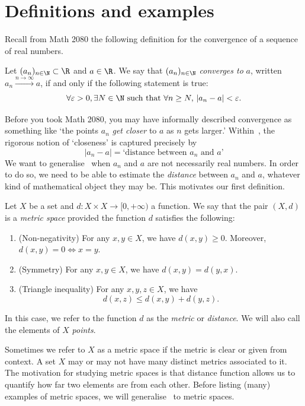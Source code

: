 \section{Definitions and examples}
\label{sec:5_1-2}
Recall from Math 2080 the following definition for the convergence of a sequence of real numbers.
\begin{defn}
	\label{defn:cvg_real}
	Let $(a_n)_{n\in\N}\subset \R$ and $a\in \R$. We say that $(a_n)_{n\in\N}$ \textit{converges to }$a$, written $a_n\overset{n\to \infty}{\to}a$, if and only if the following statement is true:
	\[
	\forall \varepsilon>0,\exists N\in\N\text{ such that }\forall n\ge N, \, |a_n - a|<\varepsilon.
	\]
\end{defn}
Before you took Math 2080, you may have informally described convergence as something like `the points $a_n$ \textit{get closer} to $a$ as $n$ gets larger.' Within~, the rigorous notion of `closeness' is captured precisely by
\[
|a_n-a| = \text{`distance between }a_n\text{ and }a\text{'}
\]
We want to generalise~ when $a_n$ and $a$ are not necessarily real numbers. In order to do so, we need to be able to estimate the \textit{distance} between $a_n$ and $a$, whatever kind of mathematical object they may be. This motivates our first definition.
\begin{defn}
	\label{defn:metric}
	Let $X$ be a set and $d:X\times X \to [0,+\infty)$ a function. We say that the pair $(X,d)$ is a \textit{metric space} provided the function $d$ satisfies the following:
	\begin{enumerate}[label = \textbf{M\arabic*)}]
		\item (Non-negativity) For any $x,y\in X$, we have $d(x,y)\ge 0$. Moreover, $d(x,y) = 0 \iff x=y$. \label{m:pos}
		\item (Symmetry) For any $x,y\in X$, we have $d(x,y) = d(y,x)$. \label{m:sym}
		\item (Triangle inequality) For any $x,y,z\in X$, we have
		\[
		d(x,z) \le d(x,y) + d(y,z).
		\]
		\label{m:tri}
	\end{enumerate}
	In this case, we refer to the function $d$ as the \textit{metric} or \textit{distance}. We will also call the elements of $X$ \textit{points}.
\end{defn}
Sometimes we refer to $X$ as a metric space if the metric is clear or given from context. A set $X$ may or may not have many distinct metrics associated to it. The motivation for studying metric spaces is that distance function allows us to quantify how far two elements are from each other. Before listing (many) examples of metric spaces, we will generalise~ to metric spaces.
